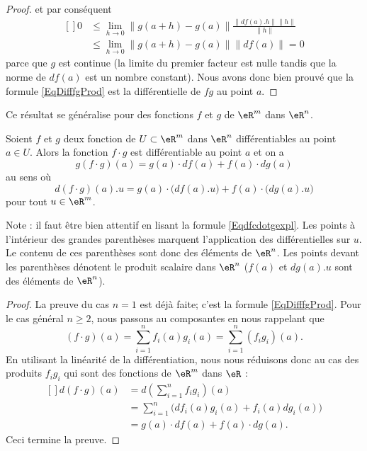 \begin{proof}
    et par conséquent
    \begin{equation}
        \begin{aligned}[]
            0&\leq\lim_{h\to 0} \| g(a+h)-g(a) \|\frac{ \| df(a).h \|\| h \| }{ \| h \| }\\
            &\leq \lim_{h\to 0} \| g(a+h)-g(a) \|\| df(a) \|=0
        \end{aligned}
    \end{equation}
    parce que $g$ est continue (la limite du premier facteur est nulle tandis que la norme de $df(a)$ est un nombre constant). Nous avons donc bien prouvé que la formule \eqref{EqDifffgProd} est la différentielle de $fg$ au point $a$.
\end{proof}
Ce résultat se généralise pour des fonctions $f$ et $g$ de $\eR^m$ dans $\eR^n$.

\begin{proposition}
	Soient $f$ et $g$ deux fonction de $U\subset\eR^m$ dans $\eR^n$ différentiables au point $a\in U$. Alors la fonction $f\cdot g$ est différentiable  au point $a$ et on a 
	\begin{equation}
		g(f\cdot g)(a)=g(a)\cdot df(a)+f(a)\cdot dg(a)
	\end{equation}
	au sens où
	\begin{equation}		\label{Eqdfcdotgexpl}
		d(f\cdot g)(a).u=g(a)\cdot\big( df(a).u \big)+f(a)\cdot\big( dg(a).u \big)
	\end{equation}
	pour tout $u\in\eR^m$.
\end{proposition}
Note : il faut être bien attentif en lisant la formule \eqref{Eqdfcdotgexpl}. Les points à l'intérieur des grandes parenthèses marquent l'application des différentielles sur $u$. Le contenu de ces parenthèses sont donc des éléments de $\eR^n$. Les points devant les parenthèses dénotent le produit scalaire dans $\eR^n$ ($f(a)$ et $dg(a).u$ sont des éléments de $\eR^n$).

\begin{proof}
	La preuve du cas $n=1$ est déjà faite; c'est la formule \eqref{EqDifffgProd}. Pour le cas général $n\geq 2$, nous passons au composantes en nous rappelant que
	\begin{equation}
		(f\cdot g)(a)=\sum_{i=1}^nf_i(a)g_i(a)=\sum_{i=1}^n(f_ig_i)(a).
	\end{equation}
	En utilisant la linéarité de la différentiation, nous nous réduisons donc au cas des produits $f_ig_i$ qui sont des fonctions de $\eR^m$ dans $\eR$ :
	\begin{equation}
		\begin{aligned}[]
			d(f\cdot g)(a)&=d\left( \sum_{i=1}^n f_ig_i \right)(a)\\
			&=\sum_{i=1}^n\big( df_i(a)g_i(a)+f_i(a)dg_i(a) \big)\\
			&=g(a)\cdot df(a)+f(a)\cdot dg(a).
		\end{aligned}
	\end{equation}
	Ceci termine la preuve.
\end{proof}

